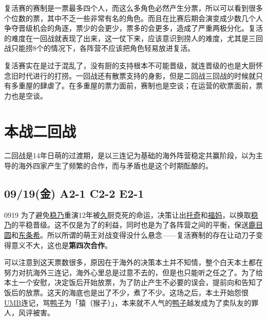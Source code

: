 复活赛的赛制是一票最多四个人，而这么多角色必然产生分票，所以可以看到很多个位数的票，其中不乏一些非常有名的角色。而且在比赛后期会演变成少数几个人争夺晋级机会的角逐，票少的会更少，票多的会更多，造成了严重两极分化。复活的难度在一回战就表现了出来，这一仗下来，应该意识到捞人的难度，尤其是三回战只能捞8个的情况下，各阵营不应该把角色轻易放进复活。

复活赛实在是过于混乱了，没有厨的支持根本不可能晋级，就连晋级的也是大厨怀念旧时代进行的打捞。一回战还有散票支持的身影，但是二回战三回战的时候就只有多重屋的肆虐了。在多重屋的票力面前，赛制也是空谈；在运营的砍票面前，票力也是空谈。

\chapter{本战二回战}

二回战是14年日萌的过渡期，是以三连记为基础的海外阵营稳定共赢阶段，以为主导的海外四家产生了频繁的合作，而与矛盾也是这个时期酝酿的。

\section{09/19(金) A2-1 C2-2 E2-1}


0919 为了避免\uline{稳乃}重演12年被\uline{久}厨克死的命运，决策让出\uline{托奇}和\uline{福妈}，以换取\uline{稳乃}的平稳晋级。这不仅是为了的利益，同时也是为了各阵营之间的平衡，保送\uline{鹿目圆}和\uline{东条希}。所以所谓的萌王对战变得没什么悬念——复活赛制的存在让动刀子变得意义不大，这也是\textbf{第四次合作}。

可以注意到这天票数很多，原因在于海外的决策本土并不知情，整个白天本土都在努力对抗海外三连记，海外心里总是过意不去的，但是也只能听之任之了。为了给本土一个安慰，决定饭后开始放票，为了防止产生不必要的误会，提前向和告知了饭后的放票。这天的海底也是出了不少，煮了不少。这场之后，本土开始怨恨\uline{UMB}连记，骂\uline{鸭子}为「猿（猴子）」，本来就不人气的\uline{鸭子}越发成为了卖队友的罪人，风评被害。

